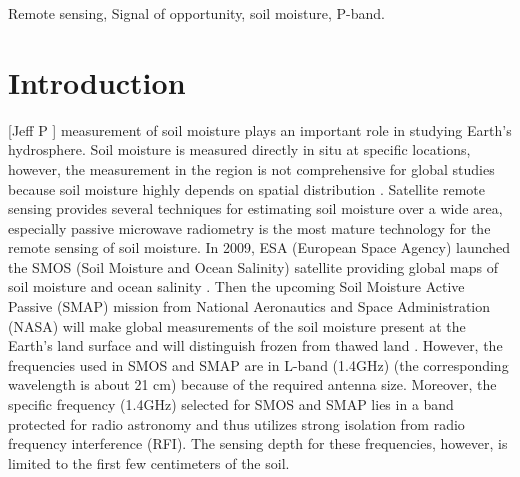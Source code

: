 \documentclass[draftcls,onecolumn]{IEEEtran}  %
\begin{document}
\begin{IEEEkeywords}
Remote sensing, Signal of opportunity, soil moisture, P-band.
\end{IEEEkeywords}


%
\IEEEpeerreviewmaketitle

\section{Introduction}
% 
% 
% 
% 
[Jeff P ]
 measurement of soil moisture plays an important role in studying Earth's hydrosphere. Soil moisture is measured directly in situ at specific locations, however, the measurement in the region is not comprehensive for global studies because soil moisture highly depends on spatial distribution \cite{Wang:2009}. Satellite remote sensing provides several techniques for estimating soil moisture over a wide area, especially passive microwave radiometry is the most mature technology for the remote sensing of soil moisture. In 2009, ESA (European Space Agency) launched the SMOS (Soil Moisture and Ocean Salinity) satellite providing global maps of soil moisture and ocean salinity \cite{Kerr:2000}. Then the upcoming Soil Moisture Active Passive (SMAP) mission from National Aeronautics and Space Administration (NASA) \cite{Entekhabi:2010} will make global measurements of the soil moisture present at the Earth's land surface and will distinguish frozen from thawed land . However, the frequencies used in SMOS and SMAP are in L-band (1.4GHz) (the corresponding wavelength is about 21 cm) because of the required antenna size. Moreover, the specific frequency (1.4GHz) selected for SMOS and SMAP lies in a band protected for radio astronomy and thus utilizes strong isolation from radio frequency interference (RFI). The sensing depth for these frequencies, however, is limited to the first few centimeters of the soil.
\end{document}
